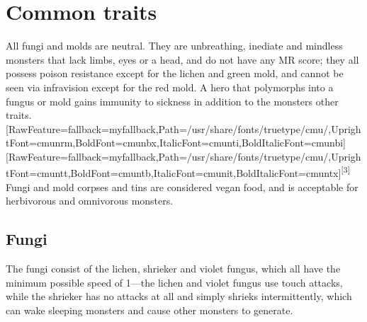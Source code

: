 \section{Common traits}
\label{1}
All fungi and molds are neutral\footnotemark[12]. They are unbreathing\footnotemark[13], inediate\footnotemark[14] and mindless\footnotemark[15] monsters that lack limbs\footnotemark[16], eyes\footnotemark[17] or a head\footnotemark[18], and do not have any MR score\footnotemark[19]; they all possess poison resistance\footnotemark[20] except for the lichen and green mold, and cannot be seen via infravision\footnotemark[21] except for the red mold. A hero\footnotemark[22] that polymorphs\footnotemark[23] into a fungus or mold gains immunity to sickness\footnotemark[24] in addition to the monster\textquotesingle{}s other traits.\allowbreak{}\setmainfont{cmunrm.ttf}[RawFeature={fallback=myfallback},Path=/usr/share/fonts/truetype/cmu/,UprightFont=cmunrm,BoldFont=cmunbx,ItalicFont=cmunti,BoldItalicFont=cmunbi]\setmonofont{cmunrm.ttf}[RawFeature={fallback=myfallback},Path=/usr/share/fonts/truetype/cmu/,UprightFont=cmuntt,BoldFont=cmuntb,ItalicFont=cmunit,BoldItalicFont=cmuntx]\textsuperscript{{$\text{[}$}3{$\text{]}$}} Fungi and mold corpses\footnotemark[25] and tins\footnotemark[26] are considered vegan\footnotemark[27] food, and is acceptable for herbivorous\footnotemark[28] and omnivorous\footnotemark[29] monsters.



\subsection{Fungi}
\label{2}
The fungi consist of the lichen, shrieker and violet fungus, which all have the minimum possible speed\footnotemark[30] of 1{\mbox{$\text{---}$}}the lichen and violet fungus use touch attacks, while the shrieker has no attacks at all and simply shrieks intermittently, which can wake sleeping monsters and cause other monsters to generate.



